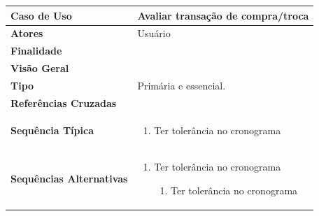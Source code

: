 \documentclass[a4paper,11pt]{article}
\begin{document}
\begin{table}[H]
		\begin{tabularx}{\textwidth}{|l|X|}
		\hline
			\textbf{Caso de Uso} &  Avaliar transação de compra/troca \\ \hline
			\textbf{Atores} &  Usuário  \\ \hline
			\textbf{Finalidade} &   \\ \hline
			\textbf{Visão Geral} &  \\ \hline
			\textbf{Tipo} &  Primária e essencial. \\ \hline
			\textbf{Referências Cruzadas} &  \\ \hline
			\textbf{Sequência Típica} & 
			\begin{enumerate}
			\item Ter tolerância no cronograma
			\end{enumerate} \\ \hline
			\textbf{Sequências Alternativas} & 
			\begin{enumerate}
			\item Ter tolerância no cronograma
			\begin{enumerate}
			\item Ter tolerância no cronograma
			\end{enumerate}
			\end{enumerate} \\ \hline
		\end{tabularx}
\end{table}
\end{document}
